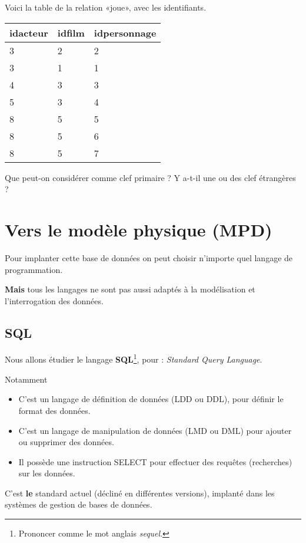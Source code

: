   Voici la table de la relation «joue», avec les identifiants.
\begin{center}
  \begin{tabular}{lll}
    \toprule
    idacteur&idfilm&idpersonnage \\
    \midrule
    3&2&2\\
    3&1&1\\
    4&3&3\\
    5&3&4\\
    8&5&5\\
    8&5&6\\
    8&5&7\\
    \bottomrule
  \end{tabular}
\end{center}
Que peut-on considérer comme clef primaire ? Y a-t-il une ou des clef étrangères ?



\section{Vers le modèle physique (MPD)}

Pour implanter  cette base de  données on peut choisir  n'importe quel
langage de programmation.

\textbf{Mais} tous les langages ne sont pas aussi adaptés à la
modélisation et l'interrogation des données.


\subsection{SQL}

Nous allons étudier le langage \textbf{SQL}\footnote{Prononcer comme le mot anglais
  \textit{sequel}.}, pour : \emph{Standard Query Language}.


Notamment
\begin{itemize}
\item C'est un langage de définition de données (LDD ou DDL), pour définir le
  format des données.
\item C'est un langage de manipulation de données (LMD ou DML) pour ajouter ou
  supprimer des données.
\item Il possède une instruction SELECT pour effectuer des requêtes (recherches) sur
  les données.
\end{itemize}

C'est \textbf{le} standard actuel (décliné en différentes versions),
implanté dans les systèmes de gestion de bases de données.

